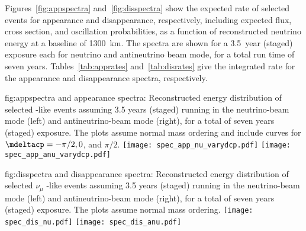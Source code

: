 Figures~\ref{fig:appspectra} and~\ref{fig:disspectra} show the expected rate of selected events for \nue appearance and \numu disappearance, respectively, including expected flux, cross section, and oscillation probabilities, as a function of reconstructed neutrino energy at a baseline of
\SI{1300}{\km}. The spectra are shown for a \num{3.5}~year (staged) exposure each for neutrino and antineutrino beam mode, for a total run time of seven %
years. Tables~\ref{tab:apprates} and~\ref{tab:disrates} give the integrated rate for the \nue %
appearance and \numu %
disappearance spectra, respectively.  

\begin{dunefigure}{fig:appspectra}
{\nue and \anue appearance spectra: Reconstructed energy distribution of selected \nue {}-like events assuming 3.5 years (staged) running in the neutrino-beam mode (left) and antineutrino-beam mode (right), for a total of seven years (staged) exposure.  The plots assume normal mass ordering and include curves for $\mdeltacp = -\pi/2, 0$, and $\pi/2$.}
 \texttt{[image: spec\_app\_nu\_varydcp.pdf]}
 \texttt{[image: spec\_app\_anu\_varydcp.pdf]}
\end{dunefigure}



\begin{dunefigure}{fig:disspectra}
{\numu and \anumu disappearance spectra: Reconstructed energy distribution of selected $\nu_{\mu}$ -like events assuming 3.5 years (staged) running in the neutrino-beam mode (left) and antineutrino-beam mode (right), for a total of seven years (staged) exposure. The plots assume normal mass ordering.}
\texttt{[image: spec\_dis\_nu.pdf]}
\texttt{[image: spec\_dis\_anu.pdf]}
\end{dunefigure}



